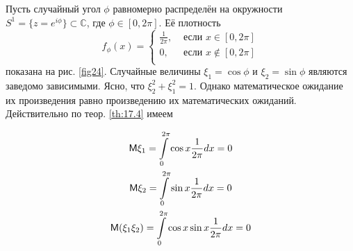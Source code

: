 \begin{example}
	Пусть случайный угол $\phi$ равномерно распределён на окружности 
	$S^1 = \{z = e^{i\phi}\} \subset \mathbb{C} $, где $\phi\in [0, 2\pi]$. Её плотность
	\begin{equation*}
		f_{\phi}(x)=
		\begin{cases}
			\frac{1}{2\pi}, &\text{ если } x\in [0,2\pi]\\
			0, &\text{ если } x\notin [0,2\pi]\\
		\end{cases}
	\end{equation*}
	показана на рис. \ref{fig24}. Случайные величины $\xi_1 = \cos\phi$ и $\xi_2 = \sin\phi$ являются заведомо зависимыми. Ясно, что $\xi_2^2+\xi_1^2=1$. Однако математическое ожидание их произведения равно произведению их математических ожиданий.
	Действительно по теор. \ref{th:17.4} имеем

	\begin{gather*}
		\mathsf{M}\xi_1=\int\limits_0^{2\pi}\cos x\frac{1}{2\pi}dx=0 
		\\
		\mathsf{M}\xi_2=\int\limits_0^{2\pi}\sin x\frac{1}{2\pi}dx=0
		\\
		\mathsf{M}(\xi_1\xi_2)=\int\limits_0^{2\pi}\cos x\sin x\frac{1}{2\pi}dx=0
	\end{gather*}
\end{example}